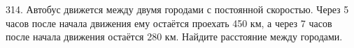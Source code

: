 314. Автобус движется между двумя городами с постоянной скоростью. Через 5 часов после начала движения ему остаётся проехать 450 км, а через 7 часов после начала движения остаётся 280 км. Найдите расстояние между городами.\\
